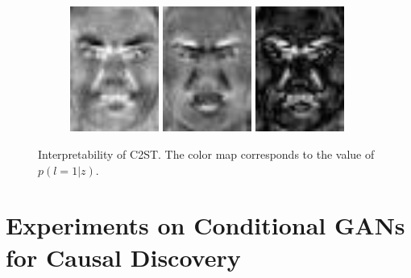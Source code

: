 \documentclass[a4paper]{article}
\begin{document}
\begin{figure}
\begin{center}
\begin{subfigure}{0.18\textwidth}
      \includegraphics[width=0.32\textwidth]{figures/faces_diff_happy.jpg}%
      \includegraphics[width=0.32\textwidth]{figures/faces_diff_angry.jpg}%
      \includegraphics[width=0.32\textwidth]{figures/faces_diff_diff.jpg}
    \end{subfigure}
    \end{center}
    \vspace{-0.2cm}
    \caption{Interpretability of C2ST. The color map corresponds to the value of $p(l=1|z)$.}
    \vspace{-0.2cm}
    \label{fig:interpretability}
  \end{figure}

  \section{Experiments on Conditional GANs for Causal Discovery}\label{sec:causality}
\end{document}
